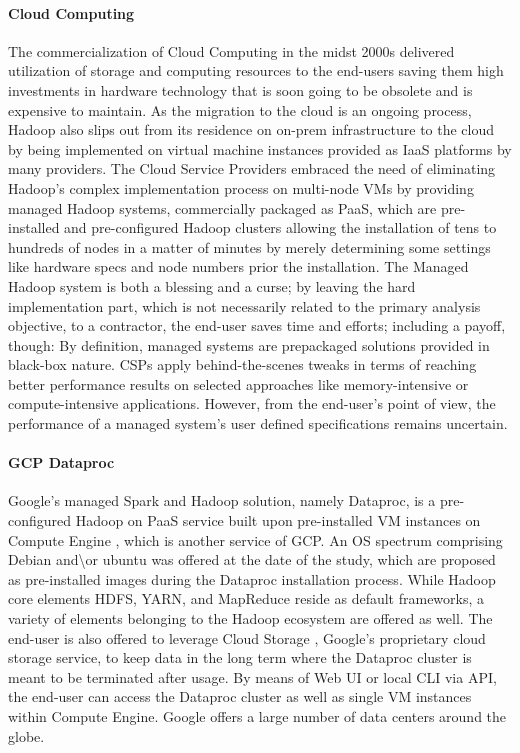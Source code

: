 \documentclass[review]{elsarticle}
\begin{document}
\paragraph{Cloud Computing}The commercialization of Cloud Computing in the midst 2000s \cite{noauthor_announcing_nodate} delivered utilization of storage and computing resources to the end-users saving them high investments in hardware technology that is soon going to be obsolete and is expensive to maintain. As the migration to the cloud is an ongoing process, Hadoop also slips out from its residence on on-prem infrastructure to the cloud by being implemented on virtual machine instances provided as IaaS platforms by many providers. The Cloud Service Providers embraced the need of eliminating Hadoop's complex implementation process on multi-node VMs by providing managed Hadoop systems, commercially packaged as PaaS, which are pre-installed and pre-configured Hadoop clusters allowing the installation of tens to hundreds of nodes in a matter of minutes by merely determining some settings like hardware specs and node numbers prior the installation. The Managed Hadoop system is both a blessing and a curse; by leaving the hard implementation part, which is not necessarily related to the primary analysis objective, to a contractor, the end-user saves time and efforts; including a payoff, though: By definition, managed systems are prepackaged solutions provided in black-box nature. CSPs apply behind-the-scenes tweaks in terms of reaching better performance results on selected approaches like memory-intensive or compute-intensive applications. However, from the end-user's point of view, the performance of a managed system's user defined specifications remains uncertain.

\paragraph{GCP Dataproc \cite{noauthor_dataproc_nodate}} Google's managed Spark and Hadoop solution, namely Dataproc, is a pre-configured Hadoop on PaaS service built upon pre-installed VM instances on Compute Engine \cite{noauthor_compute_nodate}, which is another service of GCP. An OS spectrum comprising Debian and\textbackslash{or} ubuntu was offered at the date of the study, which are proposed as pre-installed images during the Dataproc installation process. While Hadoop core elements HDFS, YARN, and MapReduce reside as default frameworks, a variety of elements belonging to the Hadoop ecosystem are offered as well. The end-user is also offered to leverage Cloud Storage \cite{noauthor_cloud_nodate}, Google's proprietary cloud storage service, to keep data in the long term where the Dataproc cluster is meant to be terminated after usage. By means of Web UI or local CLI via API, the end-user can access the Dataproc cluster as well as single VM instances within Compute Engine. Google offers a large number of data centers around the globe.
\end{document}
